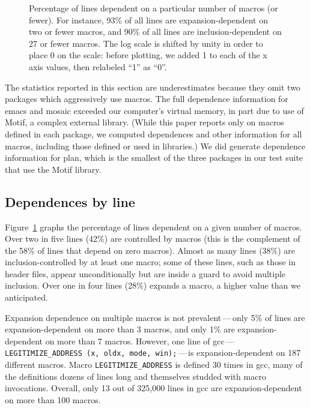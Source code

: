\documentclass[10pt]{article}
\newcommand{\pkg}[1]{\textsf{#1}}
\newcommand{\captionsmall}[1]{\caption[]{\small #1}}
\begin{document}
\begin{figure}
\centerline{}

\captionsmall{Percentage of lines dependent on a particular number of macros (or
  fewer).  For instance, 93\% of all lines are expansion-dependent on two
  or fewer macros, and 90\% of all lines are inclusion-dependent on 27 or
  fewer macros.  The log scale is shifted by unity in order to place 0
  on the scale:  before plotting, we added 1 to each of the x axis values,
  then relabeled ``1'' as ``0''.}
\label{fig:dep-byline}
\end{figure}


The statistics reported in this section are underestimates because they
omit two packages which aggressively use macros.  The full dependence
information for \pkg{emacs} and \pkg{mosaic} exceeded our computer's
virtual memory, in part due to use of Motif, a complex external library.
(While this paper reports only on macros defined in each package, we
computed dependences and other information for all macros, including those
defined or used in libraries.)  We did generate dependence information for
\pkg{plan}, which is the smallest of the three packages in our test suite
that use the Motif library.


\subsection{Dependences by line}


Figure~\ref{fig:dep-byline} graphs the percentage of lines dependent on a
given number of macros.  Over two in five lines (42\%) are controlled by
macros (this is the complement of the 58\% of lines that depend on zero
macros).  Almost as many lines (38\%) are inclusion-controlled by at least
one macro; some of these lines, such as those in header files, appear
unconditionally but are inside a guard to avoid multiple inclusion.  Over
one in four lines (28\%) expands a macro, a higher value than we
anticipated.

Expansion dependence on multiple macros is not prevalent\,---\,only 5\% of
lines are expansion-dependent on more than 3 macros, and only 1\% are
expansion-dependent on more than 7 macros.  However, one line of
\pkg{gcc}\,---\,{\tt \verb|LEGITIMIZE_ADDRESS| (x, oldx, mode,
win);}\,---\,is expansion-dependent on 187 different macros.  Macro
\verb|LEGITIMIZE_ADDRESS| is defined 30 times in \pkg{gcc}, many of the
definitions dozens of lines long and themselves studded with macro
invocations.  Overall, only 13 out of 325,000 lines in \pkg{gcc} are
expansion-dependent on more than 100 macros.
\end{document}
